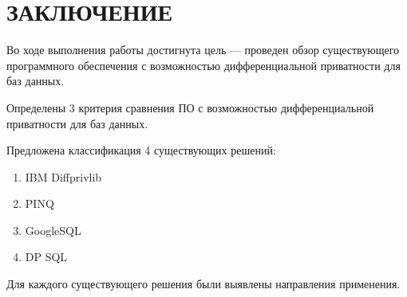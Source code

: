 \chapter*{ЗАКЛЮЧЕНИЕ}
Во ходе выполнения работы достигнута цель --- проведен обзор существующего программного обеспечения с возможностью дифференциальной приватности для баз данных.

Определены 3 критерия сравнения ПО с возможностью дифференциальной приватности для баз данных.

Предложена классификация 4 существующих решений:
\begin{enumerate}[label*=---]
	\item IBM Diffprivlib
	\item PINQ
	\item GoogleSQL
	\item DP SQL
\end{enumerate}

Для каждого существующего решения были выявлены направления применения.